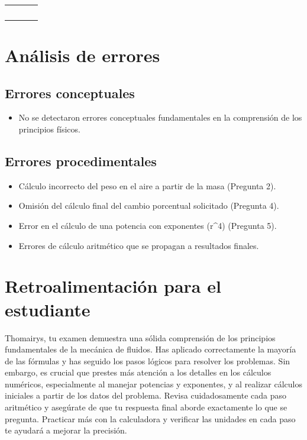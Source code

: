 \documentclass[11pt,a4paper]{article}
\begin{document}
\begin{longtable}{>{\bfseries}p{2.8cm} p{1.6cm} p{7.0cm} p{2.8cm}}
$$    \midrule
\end{longtable}

\section*{Análisis de errores}

\subsection*{Errores conceptuales}
\begin{itemize}[leftmargin=1.5em, itemsep=2pt]
  \item No se detectaron errores conceptuales fundamentales en la comprensión de los principios físicos.
\end{itemize}

\subsection*{Errores procedimentales}
\begin{itemize}[leftmargin=1.5em, itemsep=2pt]
  \item Cálculo incorrecto del peso en el aire a partir de la masa (Pregunta 2).
  \item Omisión del cálculo final del cambio porcentual solicitado (Pregunta 4).
  \item Error en el cálculo de una potencia con exponentes (r\textasciicircum{}4) (Pregunta 5).
  \item Errores de cálculo aritmético que se propagan a resultados finales.
\end{itemize}

\section*{Retroalimentación para el estudiante}
\begin{tcolorbox}[cajaRecomendacion, title={Dirigido a: thamairys sosa 33685285}]
Thomairys, tu examen demuestra una sólida comprensión de los principios fundamentales de la mecánica de fluidos. Has aplicado correctamente la mayoría de las fórmulas y has seguido los pasos lógicos para resolver los problemas. Sin embargo, es crucial que prestes más atención a los detalles en los cálculos numéricos, especialmente al manejar potencias y exponentes, y al realizar cálculos iniciales a partir de los datos del problema. Revisa cuidadosamente cada paso aritmético y asegúrate de que tu respuesta final aborde exactamente lo que se pregunta. Practicar más con la calculadora y verificar las unidades en cada paso te ayudará a mejorar la precisión.
\end{tcolorbox}
\end{document}
